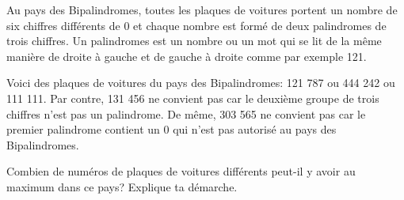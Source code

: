 

\vspace{10pt}
Au pays des Bipalindromes, toutes les plaques de voitures portent un nombre de six chiffres différents de 0 et chaque nombre est formé de deux palindromes de trois chiffres. Un palindromes est un nombre ou un mot qui se lit de la même manière de droite à gauche et de gauche à droite comme par exemple 121.

Voici des plaques de voitures du pays des Bipalindromes: 121 787 ou 444 242 ou 111 111. Par contre, 131 456 ne convient pas car le deuxième groupe de trois chiffres n'est pas un palindrome. De même, 303 565 ne convient pas car le premier palindrome contient  un 0 qui n'est pas autorisé au pays des Bipalindromes.


Combien de numéros de plaques de voitures différents peut-il y avoir au maximum dans ce pays? Explique ta démarche.

